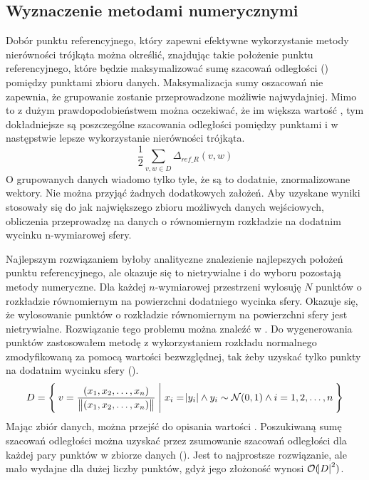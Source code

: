\subsection{Wyznaczenie metodami numerycznymi}
Dobór punktu referencyjnego, który zapewni efektywne wykorzystanie metody nierówności trójkąta można określić, znajdując takie położenie punktu referencyjnego, które będzie maksymalizować sumę szacowań odległości () pomiędzy punktami zbioru danych. Maksymalizacja sumy oszacowań nie zapewnia, że grupowanie zostanie przeprowadzone możliwie najwydajniej. Mimo to z dużym prawdopodobieństwem można oczekiwać, że im większa wartość , tym dokładniejsze są poszczególne szacowania odległości pomiędzy punktami i w następstwie lepsze wykorzystanie nierówności trójkąta.
\begin{equation}
	\frac{1}{2}\sum_{v,w \in D} \Delta_{ref\_R}(v,w)
	\label{ti:max-ti-d}
\end{equation}
O grupowanych danych wiadomo tylko tyle, że są to dodatnie, znormalizowane wektory. Nie można przyjąć żadnych dodatkowych założeń. Aby uzyskane wyniki stosowały się do jak największego zbioru możliwych danych wejściowych, obliczenia przeprowadzę na danych o równomiernym rozkładzie na dodatnim wycinku n-wymiarowej sfery.\par
Najlepszym rozwiązaniem byłoby analityczne znalezienie najlepszych położeń punktu referencyjnego, ale okazuje się to nietrywialne i do wyboru pozostają metody numeryczne. Dla każdej $ n $-wymiarowej przestrzeni wylosuję $ N $ punktów o rozkładzie równomiernym na powierzchni dodatniego wycinka sfery. Okazuje się, że wylosowanie punktów o rozkładzie równomiernym na powierzchni sfery jest nietrywialne. Rozwiązanie tego problemu można znaleźć w \cite{pickfromsphere}. Do wygenerowania punktów zastosowałem metodę z wykorzystaniem rozkładu normalnego zmodyfikowaną za pomocą wartości bezwzględnej, tak żeby uzyskać tylko punkty na dodatnim wycinku sfery (). 
\begin{equation}
	D = \Set{ v = \frac{(x_1, x_2, \dots, x_n)}{\,\norm{(x_1, x_2, \dots, x_n)}} | x_i=\abs{y_i} \land y_i \sim \mathcal{N}(0,1) \land i=1,2,\dots,n}
	\label{ti:uni-rand-on-sphere}
\end{equation}
Mając zbiór danych, można przejść do opisania wartości . Poszukiwaną sumę szacowań odległości można uzyskać przez zsumowanie szacowań odległości dla każdej pary punktów w zbiorze danych (). Jest to najprostsze rozwiązanie, ale mało wydajne dla dużej liczby punktów, gdyż jego złożoność wynosi $ \mathcal{O}(\abs{D}^2) $.\par
